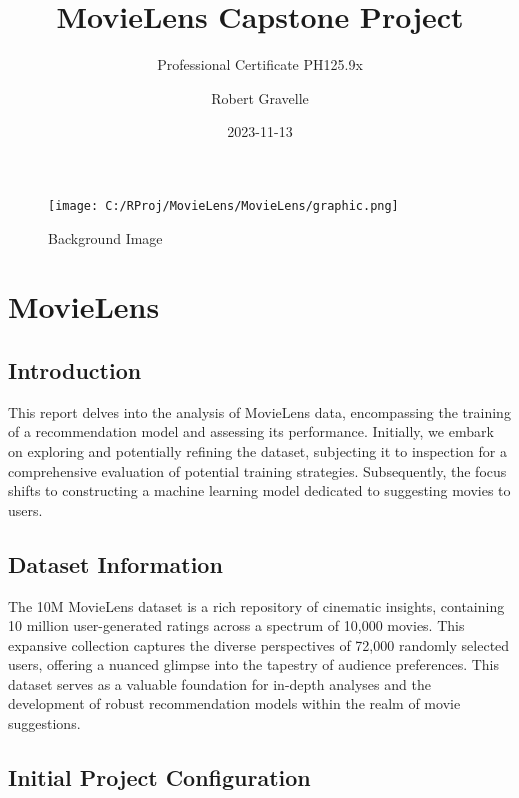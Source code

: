 \documentclass[
]{article}
\title{\centering MovieLens Capstone Project}
\subtitle{Professional Certificate PH125.9x}
\author{Robert Gravelle}
\date{2023-11-13}
\begin{document}
\maketitle

{
\setcounter{tocdepth}{2}
\tableofcontents
}
\begin{figure}
\centering
\texttt{[image: C:/RProj/MovieLens/MovieLens/graphic.png]}
\caption{Background Image}
\end{figure}

\newpage

\hypertarget{movielens}{%
\section{MovieLens}\label{movielens}}

\hypertarget{introduction}{%
\subsection{Introduction}\label{introduction}}

This report delves into the analysis of MovieLens data, encompassing the
training of a recommendation model and assessing its performance.
Initially, we embark on exploring and potentially refining the dataset,
subjecting it to inspection for a comprehensive evaluation of potential
training strategies. Subsequently, the focus shifts to constructing a
machine learning model dedicated to suggesting movies to users.

\hypertarget{dataset-information}{%
\subsection{Dataset Information}\label{dataset-information}}

The 10M MovieLens dataset is a rich repository of cinematic insights,
containing 10 million user-generated ratings across a spectrum of 10,000
movies. This expansive collection captures the diverse perspectives of
72,000 randomly selected users, offering a nuanced glimpse into the
tapestry of audience preferences. This dataset serves as a valuable
foundation for in-depth analyses and the development of robust
recommendation models within the realm of movie suggestions.

\hypertarget{initial-project-configuration}{%
\subsection{Initial Project
Configuration}\label{initial-project-configuration}}
\end{document}
